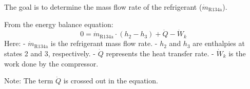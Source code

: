 The goal is to determine the mass flow rate of the refrigerant (\( \dot{m}_{\text{R134a}} \)).  

From the energy balance equation:  
\[
0 = \dot{m}_{\text{R134a}} \cdot (h_2 - h_3) + \dot{Q} - \dot{W}_k
\]  
Here:  
- \( \dot{m}_{\text{R134a}} \) is the refrigerant mass flow rate.  
- \( h_2 \) and \( h_3 \) are enthalpies at states 2 and 3, respectively.  
- \( \dot{Q} \) represents the heat transfer rate.  
- \( \dot{W}_k \) is the work done by the compressor.  

Note: The term \( \dot{Q} \) is crossed out in the equation.